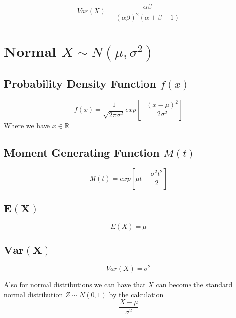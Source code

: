 \documentclass[12pt]{article}
\begin{document}
\begin{equation*}
  Var(X)= \frac{\alpha \beta}{(\alpha \beta)^{2} (\alpha + \beta + 1)}
\end{equation*}

\newpage
\section{Normal $X \sim N(\mu,\sigma^{2})$}
\subsection{Probability Density Function $f(x)$}

\begin{equation*}
  f(x) = \frac{1}{\sqrt{2\pi \sigma^{2}}}exp \left [- \frac{(x-\mu)^{2}}{2\sigma^{2}}\right]
\end{equation*}
Where we have $x \in \mathbb{R}$

\subsection{Moment Generating Function $M(t)$}
\begin{equation*}
  M(t) = exp \left [\mu t - \frac{\sigma^{2} t^{2}}{2} \right]
\end{equation*}

\subsection{$\bm{E(X)}$}

\begin{equation*}
  E(X) = \mu
\end{equation*}

\subsection{$\bm{Var(X)}$}

\begin{equation*}
  Var(X)= \sigma^{2}
\end{equation*}

Also for normal distributions we can have that $X$ can become the standard normal distribution $Z \sim N(0,1)$ by the calculation
\begin{equation*}
  \frac{X-\mu}{\sigma^{2}}
\end{equation*}
\end{document}
